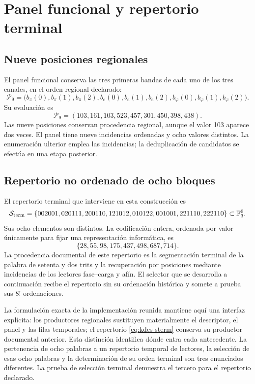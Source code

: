 \section{Panel funcional y repertorio terminal}

\subsection{Nueve posiciones regionales}

El panel funcional conserva las tres primeras bandas de cada uno de los
tres canales, en el orden regional declarado:
\begin{equation}
 \mathcal P_9=
 \bigl(b_\pi(0),b_\pi(1),b_\pi(2),
       b_e(0),b_e(1),b_e(2),
       b_\varphi(0),b_\varphi(1),b_\varphi(2)\bigr).
 \label{eq:kdes-panel}
\end{equation}
Su evaluación es
\[
 \mathcal P_9=(103,161,103,523,457,301,450,398,438).
\]
Las nueve posiciones conservan procedencia regional, aunque el valor
103 aparece dos veces. El panel tiene nueve incidencias ordenadas y
ocho valores distintos. La enumeración ulterior emplea las incidencias;
la deduplicación de candidatos se efectúa en una etapa posterior.

\subsection{Repertorio no ordenado de ocho bloques}

El repertorio terminal que interviene en esta construcción es
\begin{equation}
 \mathcal S_{\rm term}=
 \{002001,020111,200110,121012,
   010122,001001,221110,222110\}\subset\mathbb F_3^6.
 \label{eq:kdes-sterm}
\end{equation}
Sus ocho elementos son distintos. La codificación entera, ordenada por
valor únicamente para fijar una representación informática, es
\[
 \{28,55,98,175,437,498,687,714\}.
\]
La procedencia documental de este repertorio es la segmentación terminal
de la palabra de setenta y dos trits y la recuperación por posiciones
mediante incidencias de los lectores fase--carga y afín. El selector que
se desarrolla a continuación recibe el repertorio sin su ordenación
histórica y somete a prueba sus $8!$ ordenaciones.

La formulación exacta de la implementación reunida mantiene aquí una
interfaz explícita: los productores regionales sustituyen materialmente
el descriptor, el panel y las filas temporales; el repertorio
\eqref{eq:kdes-sterm} conserva su productor documental anterior. Esta
distinción identifica dónde entra cada antecedente. La pertenencia de
ocho palabras a un repertorio temporal de lectores, la selección de esas
ocho palabras y la determinación de su orden terminal son tres
enunciados diferentes. La prueba de selección terminal demuestra el
tercero para el repertorio declarado.


